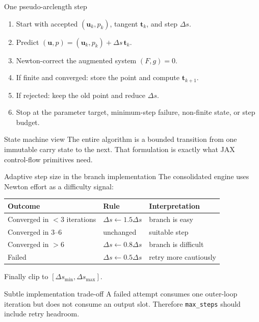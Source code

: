 \documentclass[aspectratio=169,10pt]{beamer}
\newcommand{\state}{\bm{u}}
\newcommand{\tangent}{\bm{t}}
\begin{document}
\begin{frame}{One pseudo-arclength step}
\begin{enumerate}
  \item Start with accepted $(\state_k,p_k)$, tangent $\tangent_k$, and step $\Delta s$.
  \item Predict $(\state,p)=(\state_k,p_k)+\Delta s\,\tangent_k$.
  \item Newton-correct the augmented system $(F,g)=0$.
  \item If finite and converged: store the point and compute $\tangent_{k+1}$.
  \item If rejected: keep the old point and reduce $\Delta s$.
  \item Stop at the parameter target, minimum-step failure, non-finite state, or step budget.
\end{enumerate}
\begin{block}{State machine view}
The entire algorithm is a bounded transition from one immutable carry state to the next. That formulation is exactly what JAX control-flow primitives need.
\end{block}
\end{frame}

\begin{frame}{Adaptive step size in the branch implementation}
The consolidated engine uses Newton effort as a difficulty signal:
\begin{center}
\begin{tabular}{lll}
\toprule
Outcome & Rule & Interpretation\\
\midrule
Converged in $<3$ iterations & $\Delta s\leftarrow1.5\Delta s$ & branch is easy\\
Converged in $3$--$6$ & unchanged & suitable step\\
Converged in $>6$ & $\Delta s\leftarrow0.8\Delta s$ & branch is difficult\\
Failed & $\Delta s\leftarrow0.5\Delta s$ & retry more cautiously\\
\bottomrule
\end{tabular}
\end{center}
Finally clip to $[\Delta s_{\min},\Delta s_{\max}]$.
\begin{alertblock}{Subtle implementation trade-off}
A failed attempt consumes one outer-loop iteration but does not consume an output slot. Therefore \texttt{max\_steps} should include retry headroom.
\end{alertblock}
\end{frame}
\end{document}
